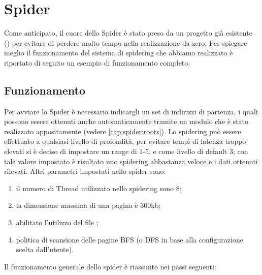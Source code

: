 \chapter{Spider}\label{cap:spider}
Come anticipato, il cuore dello Spider è stato preso da un progetto già esistente () per evitare di perdere molto tempo nella realizzazione da zero. Per spiegare meglio il funzionamento del sistema di spidering che abbiamo realizzato è riportato di seguito un esempio di funzionamento completo.
\section{Funzionamento}
Per avviare lo Spider è necessario indicargli un set di indirizzi di partenza, i quali possono essere ottenuti anche automaticamente tramite un modulo che è stato realizzato appositamente (vedere \ref{cap:spider:roots}). Lo spidering può essere effettuato a qualsiasi livello di profondità, per evitare tempi di latenza troppo elevati si è deciso di impostare un range di 1-5, e come livello di default 3; con tale valore impostato è risultato uno spidering abbastanza veloce e i dati ottenuti rilevati. Altri parametri impostati nello spider sono:
\begin{enumerate}
\item il numero di Thread utilizzato nello spidering sono 8;
\item la dimensione massima di una pagina è 300kb;
\item abilitato l'utilizzo del file ;
\item politica di scansione delle pagine BFS (o DFS in base alla configurazione scelta dall'utente).
\end{enumerate}
Il funzionamento generale dello spider è riassunto nei passi seguenti:
